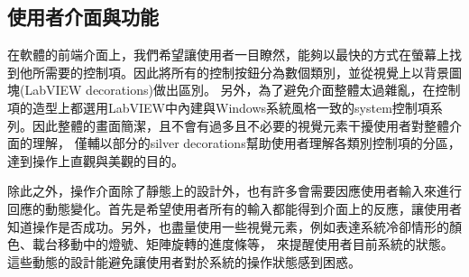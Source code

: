 \documentclass[12pt]{article}
\begin{document}
    \subsection{使用者介面與功能}
    在軟體的前端介面上，我們希望讓使用者一目瞭然，能夠以最快的方式在螢幕上找到他所需要的控制項。因此將所有的控制按鈕分為數個類別，並從視覺上以背景圖塊(LabVIEW decorations)做出區別。
    另外，為了避免介面整體太過雜亂，在控制項的造型上都選用LabVIEW中內建與Windows系統風格一致的system控制項系列。因此整體的畫面簡潔，且不會有過多且不必要的視覺元素干擾使用者對整體介面的理解，
    僅輔以部分的silver decorations幫助使用者理解各類別控制項的分區，達到操作上直觀與美觀的目的。

    除此之外，操作介面除了靜態上的設計外，也有許多會需要因應使用者輸入來進行回應的動態變化。首先是希望使用者所有的輸入都能得到介面上的反應，讓使用者知道操作是否成功。另外，也盡量使用一些視覺元素，例如表達系統冷卻情形的顏色、載台移動中的燈號、矩陣旋轉的進度條等，
    來提醒使用者目前系統的狀態。這些動態的設計能避免讓使用者對於系統的操作狀態感到困惑。
\end{document}
